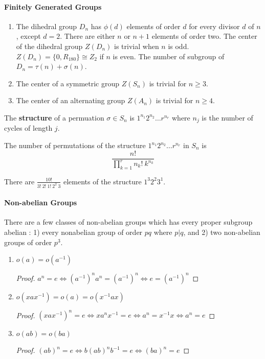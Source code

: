 \paragraph{Finitely Generated Groups}
\begin{enumerate}
	\item The dihedral group $D_n$ has $\phi(d)$ elements of order $d$ for every divisor $d$ of $n$, except $d=2$. There are either $n$ or $n+1$ elements of order two.
	The center of the dihedral group $Z(D_n)$ is trivial when $n$ is odd.
	$Z(D_n) = \{ 0,R_{180}\} \cong Z_2$ if $n$ is even.
	The number of subgroup of $D_n = \tau(n)+\sigma(n)$.
	\item The center of a symmetric group $Z(S_n)$ is trivial for $n \ge 3$.
	\item The center of an alternating group $Z(A_n)$ is trivial for $n \ge 4$.
\end{enumerate}

\begin{definition}
	The \textbf{structure} of a permuation $\sigma \in S_n$ is $1^{n_1} 2^{n_2} \dots r^{n_r}$ where $n_j$ is the number of cycles of length $j$.
\end{definition}
	The number of permutations of the structure $1^{n_1} 2^{n_2} \dots r^{n_r}$ in $S_n$ is
	$$ \frac{n!}{\prod_{k=1}^r n_k!\ k^{n_k}}$$

	There are $\frac{10!}{3!\ 2!\ 1!\ 2^2\ 3}$ elements of the structure $1^3 2^2 3^1$.


\paragraph{Non-abelian Groups}
	There are a few classes of non-abelian groups which has every proper subgroup abelian : 
	1) every nonabelian group of order $pq$ where $p|q$, and
	2) two non-abelian groups of order $p^3$.

\begin{enumerate}
	\item $o(a)=o(a^{-1})$
	\begin{proof}
		$a^n = e \iff (a^{-1})^n a^n = (a^{-1})^n \iff e = (a^{-1})^n$
	\end{proof}
	\item $o(xax^{-1}) = o(a) = o(x^{-1}ax)$
	\begin{proof}
		$(xax^{-1})^n = e \iff  xa^nx^{-1} = e \iff a^n = x^{-1}x \iff a^n = e$
	\end{proof}
	\item $o(ab) = o(ba)$
	\begin{proof}
		$(ab)^n = e \iff b(ab)^nb^{-1} = e \iff (ba)^n = e$
	\end{proof}
\end{enumerate}

